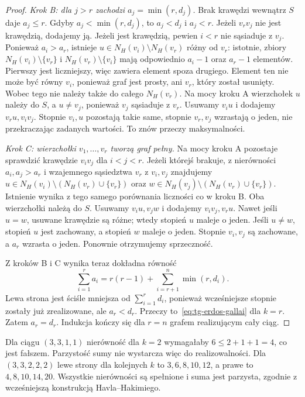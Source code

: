 \begin{proof}
\smallskip
\noindent\textit{Krok B: dla $j>r$ zachodzi
$a_j=\min(r,d_j)$.}
Brak krawędzi wewnątrz $S$ daje $a_j\le r$.
Gdyby $a_j<\min(r,d_j)$, to $a_j<d_j$ i $a_j<r$.
Jeżeli $v_rv_j$ nie jest krawędzią, dodajemy ją.
Jeżeli jest krawędzią, pewien $i<r$ nie sąsiaduje
z $v_j$. Ponieważ $a_i>a_r$, istnieje
$u\in N_H(v_i)\setminus N_H(v_r)$ różny od $v_r$:
istotnie, zbiory $N_H(v_i)\setminus\{v_r\}$
i $N_H(v_r)\setminus\{v_i\}$ mają odpowiednio
$a_i-1$ oraz $a_r-1$ elementów. Pierwszy jest
liczniejszy, więc zawiera element spoza drugiego.
Element ten nie może być równy $v_i$, ponieważ
graf jest prosty, ani $v_r$, który został usunięty.
Wobec tego nie należy także do całego $N_H(v_r)$.
Na mocy kroku A wierzchołek $u$ należy do $S$,
a $u\ne v_j$, ponieważ $v_j$ sąsiaduje z $v_r$.
Usuwamy $v_iu$ i dodajemy $v_ru,v_iv_j$.
Stopnie $v_i,u$ pozostają takie same, stopnie
$v_r,v_j$ wzrastają o jeden, nie przekraczając
zadanych wartości. To znów przeczy maksymalności.

\smallskip
\noindent\textit{Krok C: wierzchołki $v_1,\ldots,v_r$
tworzą graf pełny.}
Na mocy kroku A pozostaje sprawdzić krawędzie
$v_iv_j$ dla $i<j<r$. Jeżeli którejś brakuje,
z nierówności $a_i,a_j>a_r$ i wzajemnego sąsiedztwa
$v_r$ z $v_i,v_j$ znajdujemy
$u\in N_H(v_i)\setminus(N_H(v_r)\cup\{v_r\})$ oraz
$w\in N_H(v_j)\setminus(N_H(v_r)\cup\{v_r\})$.
Istnienie wynika z tego samego porównania liczności
co w kroku B. Oba wierzchołki należą do $S$.
Usuwamy $v_iu,v_jw$ i dodajemy $v_iv_j,v_ru$.
Nawet jeśli $u=w$, usuwane krawędzie są różne;
wtedy stopień $u$ maleje o jeden. Jeśli $u\ne w$,
stopień $u$ jest zachowany, a stopień $w$ maleje
o jeden. Stopnie $v_i,v_j$ są zachowane, a $a_r$
wzrasta o jeden. Ponownie otrzymujemy sprzeczność.

Z kroków B i C wynika teraz dokładna równość
\[
\sum_{i=1}^r a_i=r(r-1)+\sum_{i=r+1}^n\min(r,d_i).
\]
Lewa strona jest ściśle mniejsza od $\sum_{i=1}^r d_i$,
ponieważ wcześniejsze stopnie zostały już zrealizowane,
ale $a_r<d_r$. Przeczy to~\eqref{eq:tg-erdos-gallai}
dla $k=r$. Zatem $a_r=d_r$. Indukcja kończy się dla $r=n$
grafem realizującym cały ciąg.
\end{proof}

\begin{przyklad}
Dla ciągu $(3,3,1,1)$ nierówność dla $k=2$ wymagałaby
$6\le2+1+1=4$, co jest fałszem. Parzystość sumy nie
wystarcza więc do realizowalności. Dla $(3,3,2,2,2)$
lewe strony dla kolejnych $k$ to $3,6,8,10,12$,
a prawe to $4,8,10,14,20$. Wszystkie nierówności są
spełnione i suma jest parzysta, zgodnie z wcześniejszą
konstrukcją Havla--Hakimiego.
\end{przyklad}


